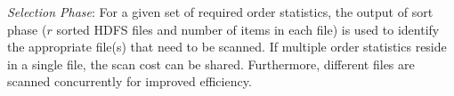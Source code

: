 \textit{Selection Phase}: For a given set of required order statistics, the output of sort phase ($r$ sorted HDFS files and number of items in each file) is used to identify the appropriate file(s) that need to be scanned. If multiple order statistics reside in a single file, the scan cost can be shared. Furthermore, different files are scanned concurrently for improved efficiency.


